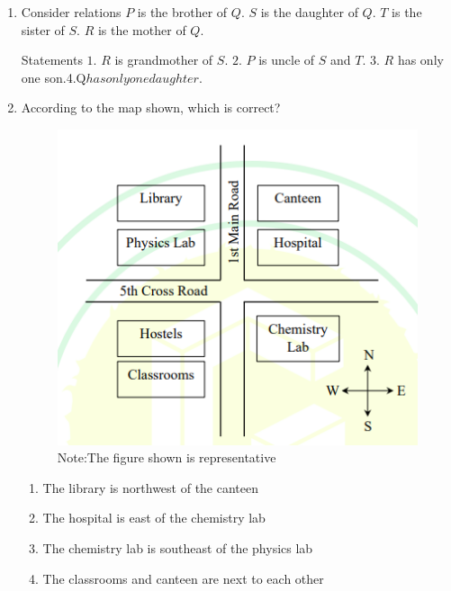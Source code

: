 \documentclass[journal,12pt,onecolumn]{IEEEtran}
\theoremstyle{remark}
\begin{document}
\begin{enumerate}
\item Consider relations\brak{\text{:}}  
$P$ is the brother of $Q$.  
$S$ is the daughter of $Q$.  
$T$ is the sister of $S$.  
$R$ is the mother of $Q$.

Statements\brak{\text{:}}  
$1.$ $R$ is grandmother of $S$.  
$2.$ $P$ is uncle of $S$ and $T$.  
$3.$ $R$ has only one son$.  
$4.$ $Q$ has only one daughter$.

\begin{enumerate}
\end{enumerate}
\hfill{}

\item According to the map shown, which is correct?

\begin{figure}[H]
\centering
\includegraphics[width=0.6\columnwidth]{figs/Q-5.png}
\caption*{Note:The figure shown is representative}
\label{fig:q5}
\end{figure}

\begin{enumerate}
\item The library is northwest of the canteen
\item The hospital is east of the chemistry lab
\item The chemistry lab is southeast of the physics lab
\item The classrooms and canteen are next to each other
\end{enumerate}
\hfill{}


\end{enumerate}
\end{document}
